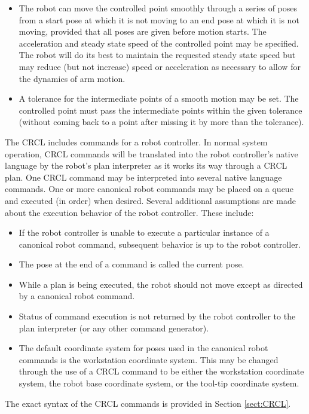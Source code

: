 \begin{itemize}
\item The robot can move the controlled point smoothly through a series of
poses from a start pose at which it is not moving to an end pose at
which it is not moving, provided that all poses are given before
motion starts. The acceleration and steady state speed of the
controlled point may be specified. The robot will do its best to
maintain the requested steady state speed but may reduce (but not
increase) speed or acceleration as necessary to allow for the dynamics
of arm motion.

\item A tolerance for the intermediate points of a smooth motion may be set.
The controlled point must pass the intermediate points within the
given tolerance (without coming back to a point after missing it by
more than the tolerance).
\end{itemize}

The CRCL includes commands for a robot controller. In normal system operation,
CRCL commands will be translated into the robot controller's native
language by the robot's plan interpreter as it works its way through a
CRCL plan. One CRCL command may be interpreted into several native
language commands.
One or more canonical robot commands may be placed on a queue and
executed (in order) when desired. Several additional assumptions are
made about the execution behavior of the robot controller. These include:

\begin{itemize}
\item If the robot controller is unable to execute a particular instance of a
canonical robot command, subsequent behavior is up to the robot
controller.

\item The pose at the end of a command is called the current pose.

\item While a plan is being executed, the robot should not move except as
directed by a canonical robot command.

\item Status of command execution is not returned by the robot controller to
the plan interpreter (or any other command generator).

\item The default coordinate system for poses used in the canonical robot commands is
the workstation coordinate system. This may be changed through the use of
a CRCL command to be either the workstation coordinate system, the
robot base coordinate system, or the tool-tip coordinate system.
\end{itemize}

The exact syntax of the CRCL commands is provided in Section \ref{sect:CRCL}.
